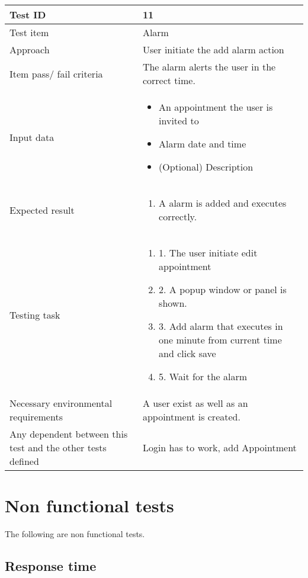 \documentclass[a4paper, 10pt]{article}
\begin{document}
\begin{tabularx}{\textwidth}{ |X|X| }
\hline
\rowcolor{Gray}
Test ID & 11 \\ \hline
Test item & Alarm \\ \hline
Approach & User initiate the add alarm action \\ \hline
Item pass/ fail criteria & The alarm alerts the user in the correct time.\\ \hline
Input data &
\begin{itemize}
\item An appointment the user is invited to
\item Alarm date and time
\item (Optional) Description
\end{itemize}\\ \hline
Expected result &
\begin{enumerate}
\item A alarm is added and executes correctly.
\end{enumerate} \\ \hline
Testing task &
\begin{enumerate}
\item 1. The user initiate edit appointment
\item 2. A popup window or panel is shown.
\item 3. Add alarm that executes in one minute from current time and click save
\item 5. Wait for the alarm
\end{enumerate}	\\ \hline
Necessary environmental requirements & A user exist as well as an appointment is created. \\ \hline
Any dependent between this test and the other tests defined & Login has to work, add Appointment \\ \hline

\end{tabularx}

\newpage

\section{Non functional tests}
The following are non functional tests.
\subsection{Response time}
\end{document}
